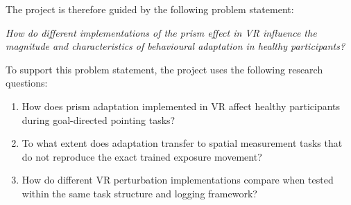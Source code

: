 The project is therefore guided by the following problem statement:

\begin{center}
\textit{How do different implementations of the prism effect in VR influence the magnitude and characteristics of behavioural adaptation in healthy participants?}
\end{center}

To support this problem statement, the project uses the following research questions:

\begin{enumerate}
    \item How does prism adaptation implemented in VR affect healthy participants during goal-directed pointing tasks?
    \item To what extent does adaptation transfer to spatial measurement tasks that do not reproduce the exact trained exposure movement?
    \item How do different VR perturbation implementations compare when tested within the same task structure and logging framework?
\end{enumerate}
